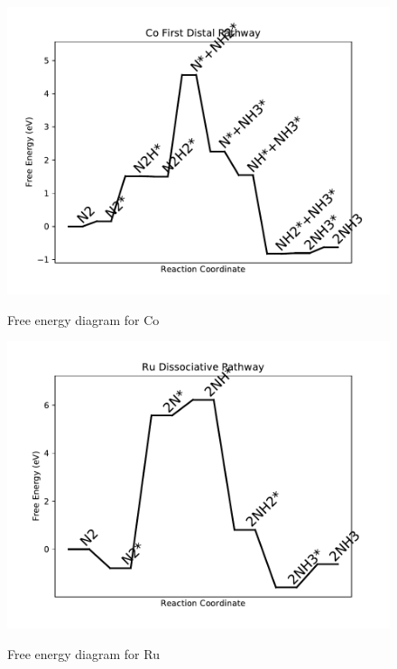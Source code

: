 \documentclass{article}
\begin{document}
\begin{figure}
\includegraphics[width=1\linewidth]{data/plots/Co_distal_1.pdf}
\label{fig:Co_distal_1}
\caption{Free energy diagram for Co}
\end{figure}

\begin{figure}
\includegraphics[width=1\linewidth]{data/plots/Ru_dissociative.pdf}
\label{fig:Ru_dissociative}
\caption{Free energy diagram for Ru}
\end{figure}
\end{document}
